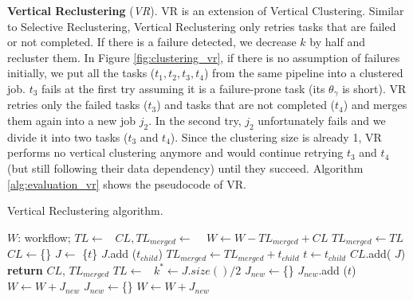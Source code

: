 \textbf{Vertical Reclustering} (\emph{VR}). VR is an extension of Vertical Clustering. Similar to Selective Reclustering, Vertical Reclustering only retries tasks that are failed or not completed.
If there is a failure detected, we decrease $k$ by half and recluster them. In Figure \ref{fig:clustering_vr}, if there is no assumption of failures initially, we put all the tasks ($t_1, t_2, t_3, t_4$) from the same  pipeline into a clustered job. $t_3$ fails at the first try assuming it is a failure-prone task (its $\theta_{\gamma}$ is short). VR retries only the failed tasks ($t_3$) and tasks that are not completed ($t_4$) and merges them again into a new job $j_2$. In the second try, $j_2$ unfortunately fails and we divide it into two tasks ($t_3$ and $t_4$). Since the clustering size is already 1, VR performs no vertical clustering anymore and would continue retrying $t_3$ and $t_4$ (but still following their data dependency) until they succeed. Algorithm \ref{alg:evaluation_vr} shows the pseudocode of VR. 

\begin{algorithm}[!htb]
	\footnotesize
	\caption{Vertical Reclustering algorithm.}
	\label{alg:evaluation_vr}
	\begin{algorithmic}[1]
		\Require $W$: workflow; 
				\State $TL\gets $\  
				\State $CL, TL_{merged}\gets$  \  
				\State $W \gets W - TL_{merged} + CL$   
			\EndFor
		\EndProcedure
			\State $TL_{merged}\gets TL$
			\State $CL\gets$\{\}
				\State $J\gets$ \{$t$\}
					\State $J$.add ($t_{child}$)
					\State $TL_{merged}\gets TL_{merged} + t_{child}$ 
					\State $t\gets t_{child}$
				\EndWhile
				\State  $CL$.add( $J$)
			\EndFor
			\State \textbf{return} $CL$, $TL_{merged}$
		\EndProcedure
			\State $TL \gets$\ 
			\State $k^*\gets J.size() / 2$ 
			\State $J_{new}\gets$\{\}
					\State $J_{new}$.add ($t$)
				\EndIf
					\State $W \gets W + J_{new}$
					\State $J_{new}\gets$\{\}
				\EndIf
			\EndFor
			\State $W \gets W + J_{new}$ 
		\EndProcedure
	\end{algorithmic}
\end{algorithm}


